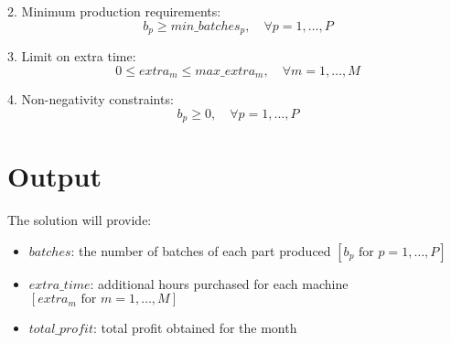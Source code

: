 \documentclass{article}
\begin{document}
2. Minimum production requirements:
\[
b_{p} \geq min\_batches_{p}, \quad \forall p = 1, \dots, P
\]

3. Limit on extra time:
\[
0 \leq extra_{m} \leq max\_extra_{m}, \quad \forall m = 1, \dots, M
\]

4. Non-negativity constraints:
\[
b_{p} \geq 0, \quad \forall p = 1, \dots, P
\]

\section*{Output}
The solution will provide:
\begin{itemize}
    \item \( batches \): the number of batches of each part produced \( [b_{p} \text{ for } p=1, \ldots, P] \)
    \item \( extra\_time \): additional hours purchased for each machine \( [extra_{m} \text{ for } m=1, \ldots, M] \)
    \item \( total\_profit \): total profit obtained for the month
\end{itemize}
\end{document}
